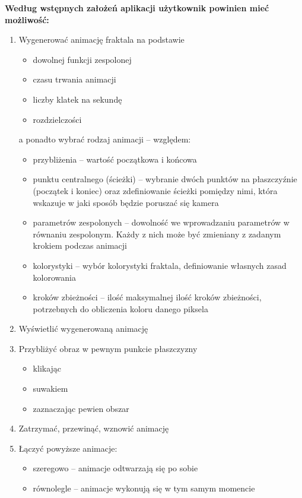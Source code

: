 \documentclass[a4paper]{article}
\begin{document}
\textbf{Według wstępnych założeń aplikacji użytkownik powinien mieć możliwość:}
\begin{enumerate}
\item Wygenerować animację fraktala na podstawie
\begin{itemize}
\item dowolnej funkcji zespolonej
\item czasu trwania animacji
\item liczby klatek na sekundę
\item rozdzielczości
\end{itemize}
a ponadto wybrać rodzaj animacji -- względem:
\begin{itemize}
\item przybliżenia -- wartość początkowa i końcowa
\item punktu centralnego (ścieżki) -- wybranie dwóch punktów na płaszczyźnie (początek i koniec) oraz zdefiniowanie ścieżki pomiędzy nimi, która wskazuje w jaki sposób będzie poruszać się kamera
\item parametrów zespolonych -- dowolność we wprowadzaniu parametrów w równaniu zespolonym. Każdy z nich może być zmieniany z zadanym krokiem podczas animacji
\item kolorystyki -- wybór kolorystyki fraktala, definiowanie własnych zasad kolorowania
\item kroków zbieżności -- ilość maksymalnej ilość kroków zbieżności, potrzebnych do obliczenia koloru danego piksela
\end{itemize}
\item Wyświetlić wygenerowaną animację
\item Przybliżyć obraz w pewnym punkcie płaszczyzny
\begin{itemize}
\item klikając
\item suwakiem
\item zaznaczając pewien obszar
\end{itemize}
\item Zatrzymać, przewinąć, wznowić animację

\item Łączyć powyższe animacje:
\begin{itemize}
\item szeregowo -- animacje odtwarzają się po sobie
\item równolegle -- animacje wykonują się w tym samym momencie
\end{itemize}


\end{enumerate}
\end{document}

